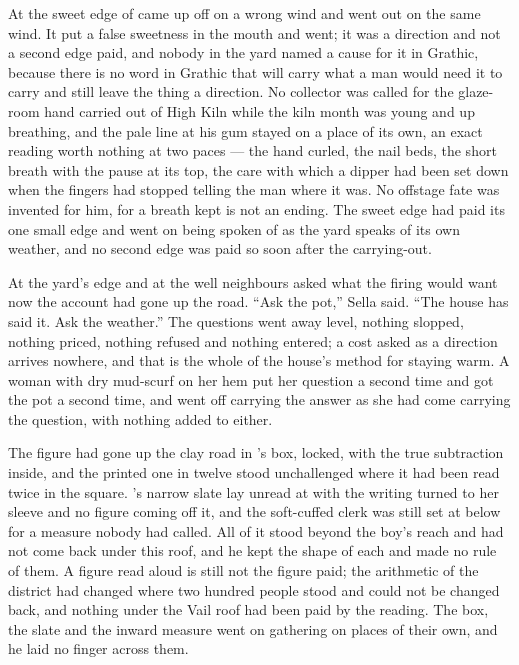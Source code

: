 \scenebreak

At  the sweet edge of  came up off  on a wrong wind and went out on the same wind. It put a false sweetness in the mouth and went; it was a direction and not a second edge paid, and nobody in the yard named a cause for it in Grathic, because there is no word in Grathic that will carry what a man would need it to carry and still leave the thing a direction. No collector was called for the glaze-room hand carried out of High Kiln while the kiln month was young and up  breathing, and the pale line at his gum stayed on a place of its own, an exact reading worth nothing at two paces --- the hand curled, the nail beds, the short breath with the pause at its top, the care with which a dipper had been set down when the fingers had stopped telling the man where it was. No offstage fate was invented for him, for a breath kept is not an ending. The sweet edge had paid its one small edge and went on being spoken of as the yard speaks of its own weather, and no second edge was paid so soon after the carrying-out.

At the yard's edge and at the well neighbours asked what the firing would want now the account had gone up the road. “Ask the pot,” Sella said. “The house has said it. Ask the weather.” The questions went away level, nothing slopped, nothing priced, nothing refused and nothing entered; a cost asked as a direction arrives nowhere, and that is the whole of the house's method for staying warm. A woman with dry mud-scurf on her hem put her question a second time and got the pot a second time, and went off carrying the answer as she had come carrying the question, with nothing added to either.

The figure had gone up the clay road in 's box, locked, with the true subtraction inside, and the printed one in twelve stood unchallenged where it had been read twice in the square. 's narrow slate lay unread at  with the writing turned to her sleeve and no figure coming off it, and the soft-cuffed clerk was still set at  below  for a measure nobody had called. All of it stood beyond the boy's reach and had not come back under this roof, and he kept the shape of each and made no rule of them. A figure read aloud is still not the figure paid; the arithmetic of the district had changed where two hundred people stood and could not be changed back, and nothing under the Vail roof had been paid by the reading. The box, the slate and the inward measure went on gathering on places of their own, and he laid no finger across them.

